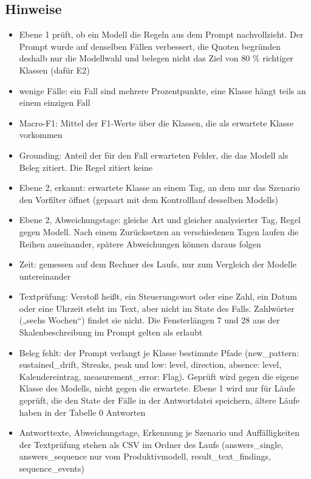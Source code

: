 \subsection*{Hinweise}
\begin{itemize}
\item Ebene 1 prüft, ob ein Modell die Regeln aus dem Prompt nachvollzieht. Der Prompt wurde auf denselben Fällen verbessert, die Quoten begründen deshalb nur die Modellwahl und belegen nicht das Ziel von 80 \% richtiger Klassen (dafür E2)
\item wenige Fälle: ein Fall sind mehrere Prozentpunkte, eine Klasse hängt teils an einem einzigen Fall
\item Macro-F1: Mittel der F1-Werte über die Klassen, die als erwartete Klasse vorkommen
\item Grounding: Anteil der für den Fall erwarteten Felder, die das Modell als Beleg zitiert. Die Regel zitiert keine
\item Ebene 2, erkannt: erwartete Klasse an einem Tag, an dem nur das Szenario den Vorfilter öffnet (gepaart mit dem Kontrolllauf desselben Modells)
\item Ebene 2, Abweichungstage: gleiche Art und gleicher analysierter Tag, Regel gegen Modell. Nach einem Zurücksetzen an verschiedenen Tagen laufen die Reihen auseinander, spätere Abweichungen können daraus folgen
\item Zeit: gemessen auf dem Rechner des Laufs, nur zum Vergleich der Modelle untereinander
\item Textprüfung: Verstoß heißt, ein Steuerungswort oder eine Zahl, ein Datum oder eine Uhrzeit steht im Text, aber nicht im State des Falls. Zahlwörter („sechs Wochen“) findet sie nicht. Die Fensterlängen 7 und 28 aus der Skalenbeschreibung im Prompt gelten als erlaubt
\item Beleg fehlt: der Prompt verlangt je Klasse bestimmte Pfade (new\_\allowbreak{}pattern: sustained\_\allowbreak{}drift, Streaks, peak und low: level, direction, absence: level, Kalendereintrag, measurement\_\allowbreak{}error: Flag). Geprüft wird gegen die eigene Klasse des Modells, nicht gegen die erwartete. Ebene 1 wird nur für Läufe geprüft, die den State der Fälle in der Antwortdatei speichern, ältere Läufe haben in der Tabelle 0 Antworten
\item Antworttexte, Abweichungstage, Erkennung je Szenario und Auffälligkeiten der Textprüfung stehen als CSV im Ordner des Laufs (answers\_\allowbreak{}single, answers\_\allowbreak{}sequence nur vom Produktivmodell, result\_\allowbreak{}text\_\allowbreak{}findings, sequence\_\allowbreak{}events)
\end{itemize}
